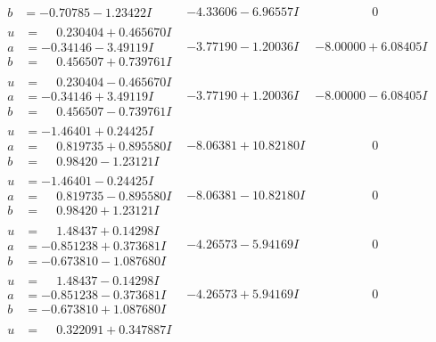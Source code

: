 \documentclass[1p]{elsarticle_modified}
\theoremstyle{definition}
\begin{document}
$$\begin{array}{c|c|c}
\begin{aligned}
b &= -0.70785 - 1.23422 I\end{aligned}
 & -4.33606 - 6.96557 I & \phantom{-0.000000 } 0 \\ \hline\begin{aligned}
u &= \phantom{-}0.230404 + 0.465670 I \\
a &= -0.34146 - 3.49119 I \\
b &= \phantom{-}0.456507 + 0.739761 I\end{aligned}
 & -3.77190 - 1.20036 I & -8.00000 + 6.08405 I \\ \hline\begin{aligned}
u &= \phantom{-}0.230404 - 0.465670 I \\
a &= -0.34146 + 3.49119 I \\
b &= \phantom{-}0.456507 - 0.739761 I\end{aligned}
 & -3.77190 + 1.20036 I & -8.00000 - 6.08405 I \\ \hline\begin{aligned}
u &= -1.46401 + 0.24425 I \\
a &= \phantom{-}0.819735 + 0.895580 I \\
b &= \phantom{-}0.98420 - 1.23121 I\end{aligned}
 & -8.06381 + 10.82180 I & \phantom{-0.000000 } 0 \\ \hline\begin{aligned}
u &= -1.46401 - 0.24425 I \\
a &= \phantom{-}0.819735 - 0.895580 I \\
b &= \phantom{-}0.98420 + 1.23121 I\end{aligned}
 & -8.06381 - 10.82180 I & \phantom{-0.000000 } 0 \\ \hline\begin{aligned}
u &= \phantom{-}1.48437 + 0.14298 I \\
a &= -0.851238 + 0.373681 I \\
b &= -0.673810 - 1.087680 I\end{aligned}
 & -4.26573 - 5.94169 I & \phantom{-0.000000 } 0 \\ \hline\begin{aligned}
u &= \phantom{-}1.48437 - 0.14298 I \\
a &= -0.851238 - 0.373681 I \\
b &= -0.673810 + 1.087680 I\end{aligned}
 & -4.26573 + 5.94169 I & \phantom{-0.000000 } 0 \\ \hline\begin{aligned}
u &= \phantom{-}0.322091 + 0.347887 I \\

\end{aligned}
\end{array}$$
\end{document}
